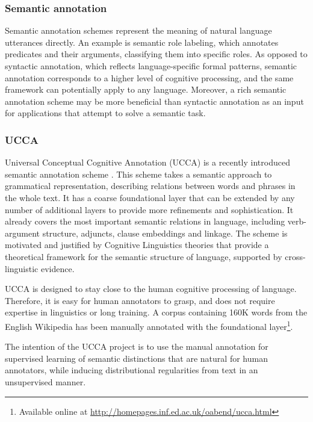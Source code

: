 \documentclass[11pt]{article}
\begin{document}
\subsubsection{Semantic annotation}

Semantic annotation schemes represent the meaning of natural language utterances directly. An example is semantic role labeling\cite{Baker:1998:BFP:980845.980860}, which annotates predicates and their arguments, classifying them into specific roles. As opposed to syntactic annotation, which reflects language-specific formal patterns, semantic annotation corresponds to a higher level of cognitive processing, and the same framework can potentially apply to any language. Moreover, a rich semantic annotation scheme may be more beneficial than syntactic annotation as an input for applications that attempt to solve a semantic task.


\subsubsection{UCCA}

Universal Conceptual Cognitive Annotation (UCCA) is a recently introduced semantic annotation scheme \cite{abend2013ucca}\cite{abend2013universal}. This scheme takes a semantic approach to grammatical representation, describing relations between words and phrases in the whole text. It has a coarse foundational layer that can be extended by any number of additional layers to provide more refinements and sophistication. It already covers the most important semantic relations in language, including verb-argument structure, adjuncts, clause embeddings and linkage. The scheme is motivated and justified by Cognitive Linguistics theories that provide a theoretical framework for the semantic structure of language, supported by cross-linguistic evidence.

UCCA is designed to stay close to the human cognitive processing of language. Therefore, it is easy for human annotators to grasp, and does not require expertise in linguistics or long training. A corpus containing 160K words from the English Wikipedia has been manually annotated with the foundational layer\footnote{Available online at \url{http://homepages.inf.ed.ac.uk/oabend/ucca.html}}.

The intention of the UCCA project is to use the manual annotation for supervised learning of semantic distinctions that are natural for human annotators, while inducing distributional regularities from text in an unsupervised manner.
\end{document}
